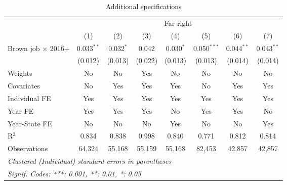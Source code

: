 \begin{table}[htbp]
   \caption{Additional specifications}
   \centering
   \begin{tabular}{lccccccc}
      \tabularnewline \midrule \midrule
       & \multicolumn{7}{c}{Far-right}\\
                                & (1)          & (2)         & (3)     & (4)         & (5)           & (6)          & (7)\\  
      Brown job $\times$ 2016+  & 0.033$^{**}$ & 0.032$^{*}$ & 0.042   & 0.030$^{*}$ & 0.050$^{***}$ & 0.044$^{**}$ & 0.043$^{**}$\\   
                                & (0.012)      & (0.013)     & (0.022) & (0.013)     & (0.013)       & (0.014)      & (0.014)\\   
      Weights                   & No           & No          & Yes     & No          & No            & No           & No\\  
      Covariates                & No           & Yes         & Yes     & Yes         & No            & Yes          & Yes\\  
      Individual FE             & Yes          & Yes         & Yes     & Yes         & Yes           & Yes          & Yes\\  
      Year FE                   & Yes          & Yes         & Yes     & No          & Yes           & Yes          & No\\  
      Year-State FE             & No           & No          & No      & Yes         & No            & No           & Yes\\  
      R$^2$                     & 0.834        & 0.838       & 0.998   & 0.840       & 0.771         & 0.812        & 0.814\\  
      Observations              & 64,324       & 55,168      & 55,159  & 55,168      & 82,453        & 42,857       & 42,857\\  
      \midrule \midrule
      \multicolumn{8}{l}{\emph{Clustered (Individual) standard-errors in parentheses}}\\
      \multicolumn{8}{l}{\emph{Signif. Codes: ***: 0.001, **: 0.01, *: 0.05}}\\
   \end{tabular}
\end{table}



